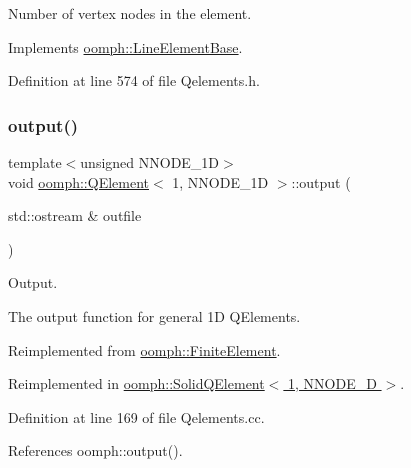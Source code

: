 Number of vertex nodes in the element. 



Implements \hyperlink{classoomph_1_1LineElementBase_ad80307523c850d58bca7b925df15e46d}{oomph\+::\+Line\+Element\+Base}.



Definition at line 574 of file Qelements.\+h.

\mbox{\label{classoomph_1_1QElement_3_011_00_01NNODE__1D_01_4_ac157449520794a71b85b66428c4e38ba}} 
\subsubsection{\texorpdfstring{output()}{output()}\hspace{0.1cm}{\footnotesize\ttfamily [1/4]}}
{\footnotesize\ttfamily template$<$unsigned N\+N\+O\+D\+E\+\_\+1D$>$ \\
void \hyperlink{classoomph_1_1QElement}{oomph\+::\+Q\+Element}$<$ 1, N\+N\+O\+D\+E\+\_\+1D $>$\+::output (\begin{DoxyParamCaption}\item[{std\+::ostream \&}]{outfile }\end{DoxyParamCaption})\hspace{0.3cm}{\ttfamily [virtual]}}



Output. 

The output function for general 1D Q\+Elements. 

Reimplemented from \hyperlink{classoomph_1_1FiniteElement_a2ad98a3d2ef4999f1bef62c0ff13f2a7}{oomph\+::\+Finite\+Element}.



Reimplemented in \hyperlink{classoomph_1_1SolidQElement_3_011_00_01NNODE__1D_01_4_aa419f785459467534f9e365dc80383b7}{oomph\+::\+Solid\+Q\+Element$<$ 1, N\+N\+O\+D\+E\+\_\+D $>$}.



Definition at line 169 of file Qelements.\+cc.



References oomph\+::output().

\mbox{\label{classoomph_1_1QElement_3_011_00_01NNODE__1D_01_4_a19fb7fd1e4def7132018d2aa0e6c00d7}} 
